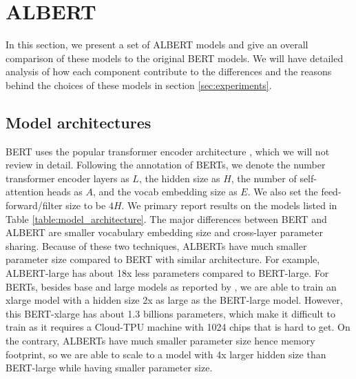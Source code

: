 \section{ALBERT}
In this section, we present a set of ALBERT models and give an overall comparison of these models to the original BERT models. 
We will have detailed analysis of how each component contribute to the differences and the reasons behind the choices of these models in section \ref{sec:experiments}.

\subsection{Model architectures}
BERT uses the popular transformer encoder architecture \citep{vaswani2017attention}, which we will not review in detail. Following the annotation of BERTs,
we denote the number transformer encoder layers as $L$, the hidden size as $H$, the number of self-attention heads as $A$,
and the vocab embedding size as $E$. We also set the feed-forward/filter size to be $4H$. We primary report results on the models listed in Table \ref{table:model_architecture}. 
The major differences between BERT and ALBERT are smaller vocabulary embedding size and cross-layer parameter sharing. Because of these two techniques, ALBERTs have much smaller parameter size compared to BERT with similar architecture. For example, ALBERT-large has about 18x less parameters compared to BERT-large. For BERTs, besides base and large models as reported by \cite{devlin2018bert}, we are able to train an xlarge model with a hidden size 2x as large as the BERT-large model. However, this BERT-xlarge has about 1.3 billions parameters, which make it difficult to train as it requires a Cloud-TPU machine with 1024 chips that is hard to get. On the contrary, ALBERTs have much smaller parameter size hence memory footprint, so we are able to scale to a model with 4x larger hidden size than BERT-large while having smaller parameter size. 




